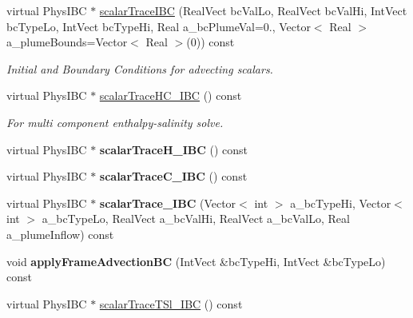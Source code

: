 \begin{DoxyCompactItemize}
\item 
virtual Phys\-I\-B\-C $\ast$ \hyperlink{class_phys_b_c_util_a3f43d8133f5a67f061a44e678018e6ae}{scalar\-Trace\-I\-B\-C} (Real\-Vect bc\-Val\-Lo, Real\-Vect bc\-Val\-Hi, Int\-Vect bc\-Type\-Lo, Int\-Vect bc\-Type\-Hi, Real a\-\_\-bc\-Plume\-Val=0., Vector$<$ Real $>$ a\-\_\-plume\-Bounds=Vector$<$ Real $>$(0)) const 
\begin{DoxyCompactList}\small\item\em Initial and Boundary Conditions for advecting scalars. \end{DoxyCompactList}\item 
\hypertarget{class_phys_b_c_util_a54d969da4cfdb8d222b8f688d26e2224}{virtual Phys\-I\-B\-C $\ast$ \hyperlink{class_phys_b_c_util_a54d969da4cfdb8d222b8f688d26e2224}{scalar\-Trace\-H\-C\-\_\-\-I\-B\-C} () const }\label{class_phys_b_c_util_a54d969da4cfdb8d222b8f688d26e2224}

\begin{DoxyCompactList}\small\item\em For multi component enthalpy-\/salinity solve. \end{DoxyCompactList}\item 
\hypertarget{class_phys_b_c_util_a63c20ba58745ef4b0ffddaeea56be2cb}{virtual Phys\-I\-B\-C $\ast$ {\bfseries scalar\-Trace\-H\-\_\-\-I\-B\-C} () const }\label{class_phys_b_c_util_a63c20ba58745ef4b0ffddaeea56be2cb}

\item 
\hypertarget{class_phys_b_c_util_a8010bc6fbfa7c558e0895289f3961c2d}{virtual Phys\-I\-B\-C $\ast$ {\bfseries scalar\-Trace\-C\-\_\-\-I\-B\-C} () const }\label{class_phys_b_c_util_a8010bc6fbfa7c558e0895289f3961c2d}

\item 
\hypertarget{class_phys_b_c_util_abe4ed912c0b312b1643dd16ea9af37fb}{virtual Phys\-I\-B\-C $\ast$ {\bfseries scalar\-Trace\-\_\-\-I\-B\-C} (Vector$<$ int $>$ a\-\_\-bc\-Type\-Hi, Vector$<$ int $>$ a\-\_\-bc\-Type\-Lo, Real\-Vect a\-\_\-bc\-Val\-Hi, Real\-Vect a\-\_\-bc\-Val\-Lo, Real a\-\_\-plume\-Inflow) const }\label{class_phys_b_c_util_abe4ed912c0b312b1643dd16ea9af37fb}

\item 
\hypertarget{class_phys_b_c_util_ae46dac1d9673a30a68be15fb27f4208c}{void {\bfseries apply\-Frame\-Advection\-B\-C} (Int\-Vect \&bc\-Type\-Hi, Int\-Vect \&bc\-Type\-Lo) const }\label{class_phys_b_c_util_ae46dac1d9673a30a68be15fb27f4208c}

\item 
\hypertarget{class_phys_b_c_util_a16ee868eeecae5c95db606a2bce0c181}{virtual Phys\-I\-B\-C $\ast$ \hyperlink{class_phys_b_c_util_a16ee868eeecae5c95db606a2bce0c181}{scalar\-Trace\-T\-Sl\-\_\-\-I\-B\-C} () const }\label{class_phys_b_c_util_a16ee868eeecae5c95db606a2bce0c181}


\end{DoxyCompactItemize}
